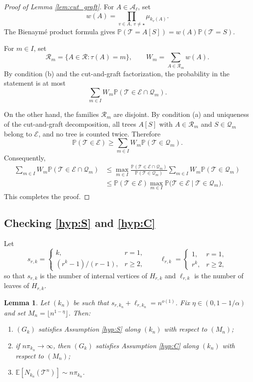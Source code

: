 \documentclass[a4paper,11pt]{article}
\newtheorem{lemma}[theorem]{Lemma}
\newcommand{\E}{\mathbb{E}}
\DeclareRobustCommand{\P}{\mathbb{P}}
\DeclareRobustCommand{\1}{\mathbf{1}}
\begin{document}
\begin{proof}[Proof of Lemma \ref{lem:cut_graft}]
For $A\in\mathscr A_\ell$, set
$$
w(A)
=
\prod_{v\in A,\ v\neq\star}\mu_{k_v(A)}.
$$
The Bienaym\'e product formula gives $
\P(\mathcal T=A[S])
=
w(A)\P(\mathcal T=S)$.

For $m\in I$, set
$$
\mathscr R_m
=
\{A\in\mathscr R:\tau(A)=m\},
\qquad
W_m
=
\sum_{A\in\mathscr R_m}w(A).
$$
By condition \textup{(b)} and the cut-and-graft factorization, the probability
in the statement is at most
$$
\sum_{m\in I}
W_m
\P(\mathcal T\in\mathcal E\cap\mathcal Q_m).
$$

On the other hand, the families $\mathscr R_m$ are disjoint. By condition
\textup{(a)} and uniqueness of the cut-and-graft decomposition, all trees
$A[S]$ with $A\in\mathscr R_m$ and $S\in\mathcal Q_m$ belong to
$\mathcal E$, and no tree is counted twice. Therefore
$$
\P(\mathcal T\in\mathcal E)
\ge
\sum_{m\in I}
W_m\P(\mathcal T\in\mathcal Q_m).
$$
Consequently,
\begin{align*}
\sum_{m\in I}
W_m\P(\mathcal T\in\mathcal E\cap\mathcal Q_m)
&\le
\max_{m\in I}
\frac{
\P(\mathcal T\in\mathcal E\cap\mathcal Q_m)
}{
\P(\mathcal T\in\mathcal Q_m)
}
\sum_{m\in I}
W_m\P(\mathcal T\in\mathcal Q_m)
\\
&\le
\P(\mathcal T\in\mathcal E)
\max_{m\in I}
\P\bigl(
\mathcal T\in\mathcal E
\mid
\mathcal T\in\mathcal Q_m
\bigr).
\end{align*}
This completes the proof.
\end{proof}

\subsection{Checking \ref{hyp:S} and \ref{hyp:C}}

Let
$$
  s_{r,k}
  =
  \begin{cases}
    k, & r=1,\\
    (r^k-1)/(r-1), & r\ge2,
  \end{cases}
  \qquad
  \ell_{r,k}
  =
  \begin{cases}
    1, & r=1,\\
    r^k, & r\ge2,
  \end{cases}
$$
so that $s_{r,k}$ is the number of internal vertices of $H_{r,k}$ and
$\ell_{r,k}$ is the number of leaves of $H_{r,k}$.

\begin{lemma}
  \label{lem:S_rary}
  Let $(k_n)$ be such that $s_{r,k_n}+\ell_{r,k_n}=n^{o(1)}$. Fix $\eta\in(0,1-1/\alpha)$ and set $M_n=\lfloor n^{1-\eta}\rfloor$. Then:
  \begin{enumerate}
    \item[(i)] $(G_k)$ satisfies Assumption \ref{hyp:S} along $(k_{n})$ with respect to $(M_n)$;
    \item[(ii)] if $n\pi_{k_n}\to\infty$, then $(G_k)$ satisfies Assumption
    \ref{hyp:C} along $(k_{n})$ with respect to $(M_n)$;
    \item[(iii)] $\E[N_{k_n}(\mathcal T^n)]\sim n\pi_{k_n}$.
  \end{enumerate}
\end{lemma}
\end{document}
